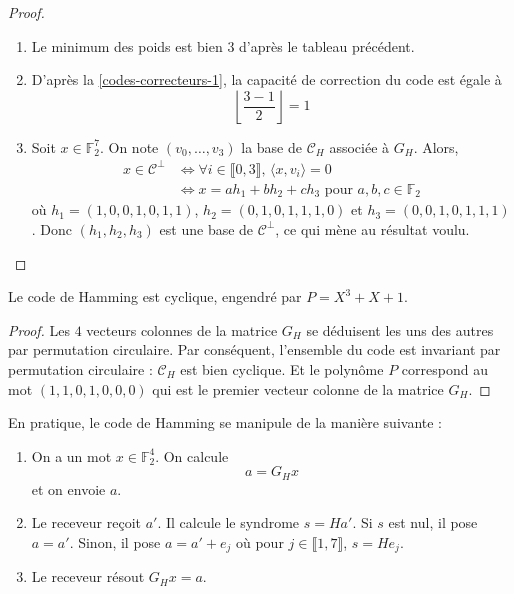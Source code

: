   \begin{proof}
    \begin{enumerate}[label=(\roman*)]
      \item Le minimum des poids est bien $3$ d'après le tableau précédent.
      \item D'après la \cref{codes-correcteurs-1}, la capacité de correction du code est égale à
      \[ \left\lfloor \frac{3-1}{2} \right\rfloor = 1 \]
      \item Soit $x \in \mathbb{F}_2^7$. On note $(v_0, \dots, v_3)$ la base de $\mathcal{C}_H$ associée à $G_H$. Alors,
      \begin{align*}
        x \in \mathcal{C}^\perp &\iff \forall i \in \llbracket 0, 3 \rrbracket, \, \langle x, v_i \rangle = 0 \\
        &\iff x = ah_1 + bh_2 + ch_3 \text{ pour } a,b,c \in \mathbb{F}_2
      \end{align*}
      où $h_1 = (1,  0,  0,  1,  0,  1,  1)$, $h_2 = (0,  1,  0,  1,  1,  1,  0)$ et $h_3 = (0,  0,  1,  0,  1,  1,  1)$. Donc $(h_1, h_2, h_3)$ est une base de $\mathcal{C}^\perp$, ce qui mène au résultat voulu.
    \end{enumerate}
  \end{proof}

  \begin{proposition}
    Le code de Hamming est cyclique, engendré par $P = X^3 + X + 1$.
  \end{proposition}

  \begin{proof}
    Les $4$ vecteurs colonnes de la matrice $G_H$ se déduisent les uns des autres par permutation circulaire. Par conséquent, l'ensemble du code est invariant par permutation circulaire : $\mathcal{C}_H$ est bien cyclique. Et le polynôme $P$ correspond au mot $(1, 1, 0, 1, 0, 0, 0)$ qui est le premier vecteur colonne de la matrice $G_H$.
  \end{proof}

  En pratique, le code de Hamming se manipule de la manière suivante :

  \begin{enumerate}
    \item On a un mot $x \in \mathbb{F}_2^4$. On calcule
    \[ a = G_H x \]
    et on envoie $a$.
    \item Le receveur reçoit $a'$. Il calcule le syndrome $s = Ha'$. Si $s$ est nul, il pose $a = a'$. Sinon, il pose $a = a' + e_j$ où pour $j \in \llbracket 1, 7 \rrbracket$, $s = He_j$.
    \item Le receveur résout $G_H x = a$.
  \end{enumerate}

